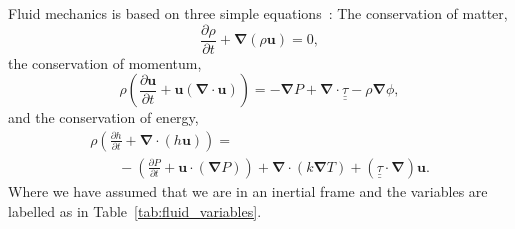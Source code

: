 Fluid mechanics is based on three simple equations~\cite{landau1959course}:
 The conservation of matter,
\begin{equation}
\frac{\partial \rho}{\partial t} + \boldsymbol{\nabla}(\rho \boldsymbol{u}) = 0,
\tag{Matter}
\label{eq:Matter}
\end{equation}
the conservation of momentum,
\begin{equation}
\rho\left (\frac{\partial \mathbf{u}}{\partial t} + \mathbf{u}(\boldsymbol{\nabla}\cdot \mathbf{u})\right) =  - \boldsymbol{\nabla}P + \boldsymbol{\nabla}\cdot \underline{\underline{\tau}} - \rho\boldsymbol{\nabla}\phi,
\tag{Momentum}
\end{equation}
and the conservation of energy,
\begin{equation}
\begin{array}{l}
\rho \left( \frac{\partial h}{\partial t} + \boldsymbol{\nabla}\cdot (h\mathbf{u})\right) = \\ \quad\quad- \left( \frac{\partial P}{\partial t} + \mathbf{u}\cdot (\boldsymbol{\nabla} P) \right) + \boldsymbol{\nabla}\cdot (k \boldsymbol{\nabla} T ) + (\underline{\underline{\tau}}\cdot\boldsymbol{\nabla})\mathbf{u}.\end{array}
\tag{Energy}
\end{equation}
Where we have assumed that we are in an inertial frame and the variables are labelled as in Table~\ref{tab:fluid_variables}.

